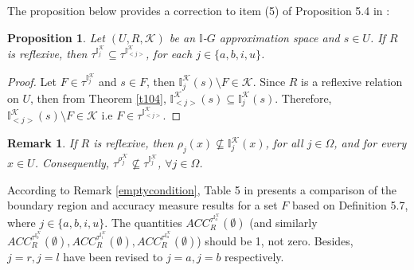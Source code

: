 \documentclass{article}
\theoremstyle{theorem}
\newtheorem{proposition}{Proposition}[section]
\newtheorem{remark}{Remark}[section]
\theoremstyle{definition}
\theoremstyle{remark}
\begin{document}
The proposition below provides a correction to item (5) of Proposition 5.4 in \cite{Al-shami 2024}:

\begin{proposition} \label{P3.1} Let $(U, R, \mathcal{K})$ be an $\mathbb{I}$-$G$ approximation space and $s\in U$. If $R$ is reflexive, then $\tau^{{\mathbb{I}_{j}^{\mathcal{K}}}}\subseteq\tau^{{\mathbb{I}_{<j>}^{\mathcal{K}}}}$, for each $j \in \{a, b, i, u\}$.

\end{proposition}
\begin{proof}
Let $F \in \tau^{{\mathbb{I}_{j}^{\mathcal{K}}}}$ and $s\in F$, then ${\mathbb{I}_{j}^{\mathcal{K}}}(s) \setminus F \in \mathcal{K}$. Since $R$ is a reflexive relation on $U$, then from Theorem \ref{t104}, $\mathbb{I}^{\mathcal{K}}_{<j>}(s) \subseteq \mathbb{I}^{\mathcal{K}}_{j}(s)$. Therefore, $\mathbb{I}^{\mathcal{K}}_{<j>}(s) \setminus F \in \mathcal{K}$ i.e $F \in \tau^{{\mathbb{I}_{<j>}^{\mathcal{K}}}}$.
\end{proof}

\begin{remark} If $R$ is reflexive, then  $\rho_{j}(x) \nsubseteq \mathbb{I}^{\mathcal{K}}_{j}(x)$, for all $j \in \Omega$, and for every $x\in U$. \color{black} Consequently, $\tau^{{\rho_{j}^{\mathcal{K}}}} \nsubseteq \tau^{{\mathbb{I}_{j}^{\mathcal{K}}}}$, $\forall j \in\Omega$.\\
\end{remark}

According to Remark \ref{emptycondition}, Table 5 in \cite{Al-shami 2024} presents a comparison of the boundary region and accuracy measure results for a set $F$ based on Definition 5.7, where $j \in \{a, b, i, u\}$. The quantities $ACC_{R}^{\tau^{\mathbb{I}^{\mathcal{K}}_{a}}}(\emptyset)$ (and similarly $ACC_{R}^{\tau^{\mathbb{I}^{\mathcal{K}}_{b}}}(\emptyset), ACC_{R}^{\tau^{\mathbb{I}^{\mathcal{K}}_{i}}}(\emptyset), ACC_{R}^{\tau^{\mathbb{I}^{\mathcal{K}}_{u}}}(\emptyset)$) should be 1, not zero. Besides, $j=r, j=l$ have been revised  to  $j=a, j=b$ respectively.
\color{black} \\
\end{document}
